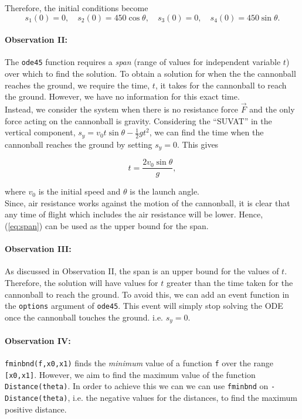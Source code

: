\documentclass[11pt]{report}
\begin{document}
	Therefore, the initial conditions become 
	\begin{equation}
		s_1(0)=0, \quad s_2(0)=450\cos{\theta}, \quad s_3(0)=0, \quad s_4(0)=450\sin{\theta}.
		\label{eq:icode45}
	\end{equation}

\paragraph{Observation II:}
The \texttt{ode45} function requires a \emph{span} (range of values for independent variable $t$) over which to find the solution. To obtain a solution for when the the cannonball reaches the ground, we require the time, $t$, it takes for the cannonball to reach the ground. However, we have no information for this exact time. \\

Instead, we consider the system when there is no resistance force $\vec{F}$ and the only force acting on the cannonball is gravity. Considering the ``SUVAT'' in the vertical component, $s_y = v_0t\sin{\theta} - \frac{1}{2}gt^2$, we can find the time when the cannonball reaches the ground by setting $s_y=0$. This gives

\begin{equation}
	t=\frac{2v_0\sin{\theta}}{g},
	\label{eq:span}
\end{equation}

where $v_0$ is the initial speed and $\theta$ is the launch angle.\\

Since, air resistance works against the motion of the cannonball, it is clear that any time of flight which includes the air resistance will be lower. Hence, (\ref{eq:span}) can be used as the upper bound for the span.

\paragraph{Observation III:}
As discussed in Observation II, the span is an upper bound for the values of $t$. Therefore, the solution will have values for $t$ greater than the time taken for the cannonball to reach the ground. To avoid this, we can add an event function in the \texttt{options} argument of \texttt{ode45}. This event will simply stop solving the ODE once the cannonball touches the ground. i.e. $s_y=0$.

\paragraph{Observation IV:}
\texttt{fminbnd(f,x0,x1)} finds the \emph{minimum} value of a function \texttt{f} over the range \texttt{[x0,x1]}. However, we aim to find the maximum value of the function \texttt{Distance(theta)}. In order to achieve this we can we can use \texttt{fminbnd} on \texttt{-Distance(theta)}, i.e. the negative values for the distances, to find the maximum positive distance.
\end{document}
